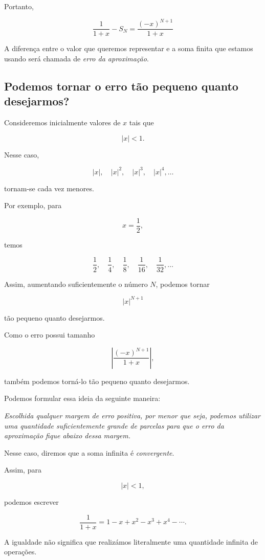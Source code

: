 \documentclass[12pt,a4paper]{article}
\begin{document}
Portanto,

\[
\boxed{
\frac{1}{1+x}-S_N
=
\frac{(-x)^{N+1}}{1+x}
}
\]

A diferença entre o valor que queremos representar e a soma finita que
estamos usando será chamada de \emph{erro da aproximação}.

\subsection{Podemos tornar o erro tão pequeno quanto desejarmos?}

Consideremos inicialmente valores de \(x\) tais que

\[
|x|<1.
\]

Nesse caso,

\[
|x|,\quad |x|^2,\quad |x|^3,\quad |x|^4,\ldots
\]

tornam-se cada vez menores.

Por exemplo, para

\[
x=\frac12,
\]

temos

\[
\frac12,\quad
\frac14,\quad
\frac18,\quad
\frac1{16},\quad
\frac1{32},\ldots
\]

Assim, aumentando suficientemente o número \(N\), podemos tornar

\[
|x|^{N+1}
\]

tão pequeno quanto desejarmos.

Como o erro possui tamanho

\[
\left|
\frac{(-x)^{N+1}}{1+x}
\right|,
\]

também podemos torná-lo tão pequeno quanto desejarmos.

Podemos formular essa ideia da seguinte maneira:

\begin{center}
\emph{Escolhida qualquer margem de erro positiva, por menor que seja,
podemos utilizar uma quantidade suficientemente grande de parcelas para
que o erro da aproximação fique abaixo dessa margem.}
\end{center}

Nesse caso, diremos que a soma infinita é \emph{convergente}.

Assim, para

\[
|x|<1,
\]

podemos escrever

\[
\frac{1}{1+x}
=
1-x+x^2-x^3+x^4-\cdots.
\]

A igualdade não significa que realizámos literalmente uma quantidade
infinita de operações.
\end{document}
